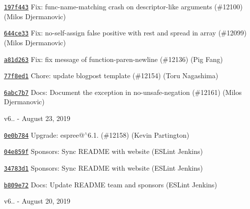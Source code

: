 \begin{DoxyItemize}
\item \href{https://github.com/eslint/eslint/commit/197f4432fca70a574028e5568c48afad12213224}{\texttt{ {\ttfamily 197f443}}} Fix\+: func-\/name-\/matching crash on descriptor-\/like arguments (\#12100) (Milos Djermanovic)
\item \href{https://github.com/eslint/eslint/commit/644ce3306748a33b74fc6a94be0267c2c9f19348}{\texttt{ {\ttfamily 644ce33}}} Fix\+: no-\/self-\/assign false positive with rest and spread in array (\#12099) (Milos Djermanovic)
\item \href{https://github.com/eslint/eslint/commit/a81d2636ce41fb34d6826c2e9857814e11cb9c30}{\texttt{ {\ttfamily a81d263}}} Fix\+: fix message of function-\/paren-\/newline (\#12136) (Pig Fang)
\item \href{https://github.com/eslint/eslint/commit/77f8ed1ad9656c526217ce54a6717fa232d522c8}{\texttt{ {\ttfamily 77f8ed1}}} Chore\+: update blogpost template (\#12154) (Toru Nagashima)
\item \href{https://github.com/eslint/eslint/commit/6abc7b72dfb824a372379708ca39340b2c7abc03}{\texttt{ {\ttfamily 6abc7b7}}} Docs\+: Document the exception in no-\/unsafe-\/negation (\#12161) (Milos Djermanovic)
\end{DoxyItemize}

v6.. -\/ August 23, 2019


\begin{DoxyItemize}
\item \href{https://github.com/eslint/eslint/commit/0e0b784b922051c2a1d39dd8160382114b645800}{\texttt{ {\ttfamily 0e0b784}}} Upgrade\+: espree@$^\wedge$6.1. (\#12158) (Kevin Partington)
\item \href{https://github.com/eslint/eslint/commit/04e859f228d081efd3af6edb22563dbc775f8d1d}{\texttt{ {\ttfamily 04e859f}}} Sponsors\+: Sync R\+E\+A\+D\+ME with website (E\+S\+Lint Jenkins)
\item \href{https://github.com/eslint/eslint/commit/34783d10ff9b58a3c1e39a36e10864caeb9f66e0}{\texttt{ {\ttfamily 34783d1}}} Sponsors\+: Sync R\+E\+A\+D\+ME with website (E\+S\+Lint Jenkins)
\item \href{https://github.com/eslint/eslint/commit/b809e72221bc658e5a42bfd4b8723d3771571f9e}{\texttt{ {\ttfamily b809e72}}} Docs\+: Update R\+E\+A\+D\+ME team and sponsors (E\+S\+Lint Jenkins)
\end{DoxyItemize}

v6.. -\/ August 20, 2019


